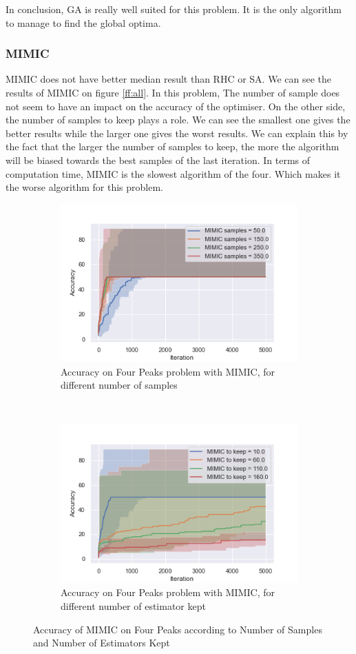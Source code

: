 \documentclass[twocolumn, 10pt]{article}
\begin{document}
				In conclusion, GA is really well suited for this problem. It is the only algorithm to manage to find the global optima.
			\subsubsection*{MIMIC}
				MIMIC does not have better median result than RHC or SA. We can see the results of MIMIC on figure \ref{ff:all}. In this problem, The number of sample does not seem to have an impact on the accuracy of the optimiser. On the other side, the number of samples to keep plays a role. We can see the smallest one gives the better results while the larger one gives the worst results. We can explain this by the fact that the larger the number of samples to keep, the more the algorithm will be biased towards the best samples of the last iteration. In terms of computation time, MIMIC is the slowest algorithm of the four. Which makes it the worse algorithm for this problem.

				\begin{figure}[h]
					\centering
					\begin{subfigure}[t]{\columnwidth}
						\centering
						\includegraphics[width=0.68\linewidth]{../graphics/four_peaks_MIMIC_Iteration_Error_MIMIC_samples.png}
						\caption{Accuracy on Four Peaks problem with MIMIC, for different number of samples}
						\label{fp:mimic_samples}
					\end{subfigure}
					~
					\begin{subfigure}[t]{\columnwidth}
						\centering
						\includegraphics[width=0.68\linewidth]{../graphics/four_peaks_MIMIC_Iteration_Error_MIMIC_to_keep.png}
						\caption{Accuracy on Four Peaks problem with MIMIC, for different number of estimator kept}
						\label{fp:mimic_to_keep}
					\end{subfigure}
					\caption{Accuracy of MIMIC on Four Peaks according to Number of Samples and Number of Estimators Kept}
					\label{fp:mimic}
				\end{figure}
\end{document}
